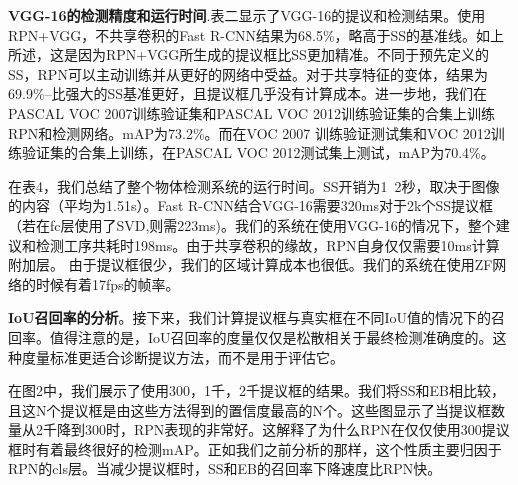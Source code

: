 \documentclass[12pt,a4paper,titlepage]{article}
\begin{document}
\textbf{VGG-16的检测精度和运行时间}.表二显示了VGG-16的提议和检测结果。使用RPN+VGG，不共享卷积的Fast R-CNN结果为68.5\%，略高于SS的基准线。如上所述，这是因为RPN+VGG所生成的提议框比SS更加精准。不同于预先定义的SS，RPN可以主动训练并从更好的网络中受益。对于共享特征的变体，结果为69.9\%--比强大的SS基准更好，且提议框几乎没有计算成本。进一步地，我们在PASCAL VOC 2007训练验证集和PASCAL VOC 2012训练验证集的合集上训练RPN和检测网络。mAP为73.2\%。而在VOC 2007 训练验证测试集和VOC 2012训练验证集的合集上训练，在PASCAL VOC 2012测试集上测试，mAP为70.4\%。  \par

在表4，我们总结了整个物体检测系统的运行时间。SS开销为1~2秒，取决于图像的内容（平均为1.51s）。Fast R-CNN结合VGG-16需要320ms对于2k个SS提议框（若在fc层使用了SVD,则需223ms)。我们的系统在使用VGG-16的情况下，整个建议和检测工序共耗时198ms。由于共享卷积的缘故，RPN自身仅仅需要10ms计算附加层。 由于提议框很少，我们的区域计算成本也很低。我们的系统在使用ZF网络的时候有着17fps的帧率。

\textbf{IoU召回率的分析}。接下来，我们计算提议框与真实框在不同IoU值的情况下的召回率。值得注意的是，IoU召回率的度量仅仅是松散相关于最终检测准确度的。这种度量标准更适合诊断提议方法，而不是用于评估它。\par

在图2中，我们展示了使用300，1千，2千提议框的结果。我们将SS和EB相比较，且这N个提议框是由这些方法得到的置信度最高的N个。这些图显示了当提议框数量从2千降到300时，RPN表现的非常好。这解释了为什么RPN在仅仅使用300提议框时有着最终很好的检测mAP。正如我们之前分析的那样，这个性质主要归因于RPN的cls层。当减少提议框时，SS和EB的召回率下降速度比RPN快。
\end{document}
